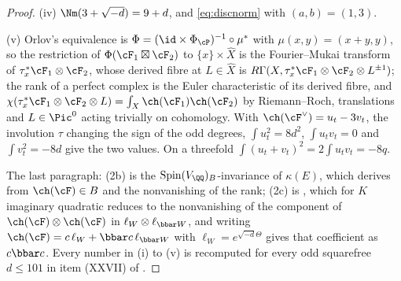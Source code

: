 \begin{proof}
(iv) $\Nm(3+\sqrt{-d})=9+d$, and \eqref{eq:discnorm} with $(a,b)=(1,3)$.

(v) Orlov's equivalence is $\Phi=(\id\times\Phi_{\cP})^{-1}\circ\mu^{*}$ with
$\mu(x,y)=(x+y,y)$, so the restriction of $\Phi(\cF_{1}\boxtimes\cF_{2})$ to
$\{x\}\times\widehat X$ is the Fourier--Mukai transform of
$\tau_{x}^{*}\cF_{1}\otimes\cF_{2}$, whose derived fibre at $L\in\widehat X$
is $R\Gamma(X,\tau_{x}^{*}\cF_{1}\otimes\cF_{2}\otimes L^{\pm1})$; the rank
of a perfect complex is the Euler characteristic of its derived fibre, and
$\chi(\tau_{x}^{*}\cF_{1}\otimes\cF_{2}\otimes L)=\int_{X}\ch(\cF_{1})\ch(\cF_{2})$
by Riemann--Roch, translations and $L\in\Pic^{0}$ acting trivially on
cohomology. With $\ch(\cF^{\vee})=u_{t}-3v_{t}$, the involution $\tau$
changing the sign of the odd degrees, $\int u_{t}^{2}=8d^{2}$,
$\int u_{t}v_{t}=0$ and $\int v_{t}^{2}=-8d$ give the two values. On a
threefold $\int(u_{t}+v_{t})^{2}=2\int u_{t}v_{t}=-8q$.

The last paragraph: (2b) is the $\mathrm{Spin}(V_{\QQ})_{B}$-invariance of
$\kappa(E)$, which \cite[Corollary 9.2]{Mar25b} derives from
$\ch(\cF)\in B$ and the nonvanishing of the rank; (2c) is
\cite[Proposition 10.2]{Mar25b}, which for $K$ imaginary quadratic reduces
to the nonvanishing of the component of $\ch(\cF)\otimes\ch(\cF)$ in
$\ell_{W}\otimes\ell_{\bbar W}$, and writing $\ch(\cF)=c\,\ell_{W}+\bbar c\,\ell_{\bbar W}$
with $\ell_{W}=e^{\sqrt{-d}\Theta}$ gives that coefficient as $c\bbar c$.
Every number in (i) to (v) is recomputed for every odd squarefree $d\le101$
in item (XXVII) of .
\end{proof}

